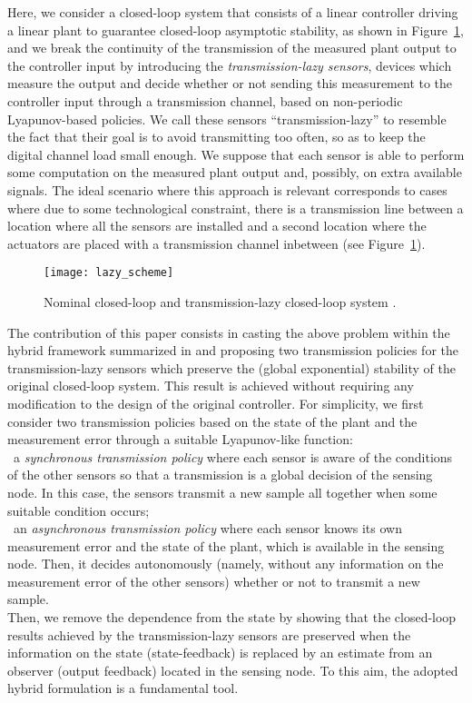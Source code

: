 \documentclass[twocolumn]{autart}
\begin{document}
Here, we consider a closed-loop system that consists of
a linear controller driving a linear plant to guarantee
closed-loop asymptotic stability, as shown in Figure~\ref{fig:SL},
and we break the continuity of the transmission of the measured
plant output  to the controller input  by 
introducing the \emph{transmission-lazy sensors}, devices which
measure the output  and decide whether or not sending
this measurement to the controller input  through a transmission channel, based on non-periodic
Lyapunov-based policies. We call these sensors ``transmission-lazy'' to 
resemble the fact that their goal is to avoid transmitting too often,
so as to keep the digital channel load small enough.
We suppose that each sensor is able to perform some computation
on the measured plant output and, possibly,
on extra available signals.
{
The ideal scenario where this approach is relevant corresponds to
cases where due to some technological constraint, there is a
transmission line between a location where all the sensors are
installed and a second location where the actuators are placed
with a transmission channel inbetween (see Figure~\ref{fig:SL}).}


\begin{figure}[ht!]
\centering
\texttt{[image: lazy\_scheme]}
 	\caption{Nominal closed-loop  and 
transmission-lazy closed-loop system .}
 	\label{fig:SL}
\end{figure}
The contribution of this paper consists in casting 
the above problem within the hybrid framework summarized in \cite{GoebelCSM09}
and proposing two transmission policies for the transmission-lazy sensors
which preserve the (global exponential) stability of the original closed-loop
system. { This result is achieved without requiring any modification
to the design of the original controller}. 
For simplicity, we first consider two transmission 
policies based on the state of the plant and the
measurement error through a suitable Lyapunov-like function:\\
\textbullet~a \emph{synchronous transmission policy} 
 where each sensor is aware of the conditions
 of the other sensors so that a transmission 
 is a global decision { of the sensing node}. In this case, the sensors 
 transmit a new sample all together when some suitable condition occurs;\\
\textbullet~an \emph{asynchronous transmission policy} 
 where each sensor knows its own measurement error and the state of
 the plant, { which is available in the sensing node}. Then,
 it decides autonomously { (namely, without any information on the measurement 
 error of the  other sensors) } whether or not to transmit a new sample.\\
Then, we remove the dependence from the state by showing that the closed-loop
results achieved by the transmission-lazy sensors are preserved when the information
on the state (state-feedback) is replaced by an estimate 
from an observer (output feedback) { located in the sensing
  node.
To this aim, the adopted hybrid formulation is a fundamental tool.} 
\end{document}

